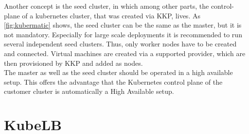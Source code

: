 Another concept is the seed cluster, in which among other parts, the control-plane of a kubernetes cluster, that was created via KKP, lives.
As \autoref{fig:kubermatic} shows, the seed cluster can be the same as the master, but it is not mandatory.
Especially for large scale deployments it is recommended to run several independent seed clusters.
Thus, only worker nodes have to be created and connected.
Virtual machines are created via a supported provider, which are then provisioned by KKP and added as nodes.
\\
The master as well as the seed cluster should be operated in a high available setup.
This offers the advantage that the Kubernetes control plane of the customer cluster is automatically a High Available setup.


\section{KubeLB}\label{sec:KubeLB}

